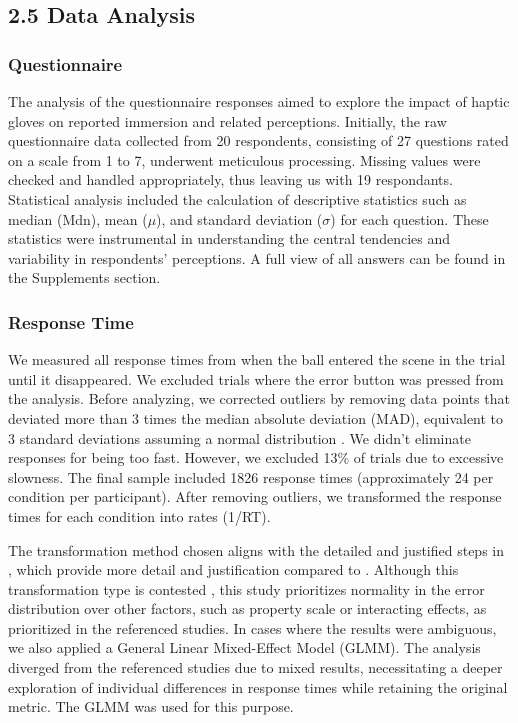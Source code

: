 \documentclass[12pt,oneside,openright]{report}
\begin{document}
\subsection*{2.5 Data Analysis}

\subsubsection*{Questionnaire}
The analysis of the questionnaire responses aimed to explore the impact of haptic gloves on reported immersion and related perceptions. Initially, the raw questionnaire data collected from 20 respondents, consisting of 27 questions rated on a scale from 1 to 7, underwent meticulous processing. Missing values were checked and handled appropriately, thus leaving us with 19 respondants. Statistical analysis included the calculation of descriptive statistics such as median ($\text{Mdn}$), mean ($\mu$), and standard deviation ($\sigma$) for each question. These statistics were instrumental in understanding the central tendencies and variability in respondents' perceptions. A full view of all answers can be found in the Supplements section. 

\subsubsection*{Response Time}
We measured all response times from when the ball entered the scene in the trial until it disappeared. We excluded trials where the error button was pressed from the analysis. Before analyzing, we corrected outliers by removing data points that deviated more than 3 times the median absolute deviation (MAD), equivalent to 3 standard deviations assuming a normal distribution \parencite{Innes2019ACA}. We didn't eliminate responses for being too fast. However, we excluded 13\% of trials due to excessive slowness. The final sample included 1826 response times (approximately 24 per condition per participant). After removing outliers, we transformed the response times for each condition into rates (1/RT).

The transformation method chosen aligns with the detailed and justified steps in \textcite{Innes2019ACA}, which provide more detail and justification compared to \textcite{SALTAFOSSI2023108642}. Although this transformation type is contested \parencite{Lo2015-fv}, this study prioritizes normality in the error distribution over other factors, such as property scale or interacting effects, as prioritized in the referenced studies. In cases where the results were ambiguous, we also applied a General Linear Mixed-Effect Model (GLMM). The analysis diverged from the referenced studies due to mixed results, necessitating a deeper exploration of individual differences in response times while retaining the original metric. The GLMM was used for this purpose.
\end{document}
